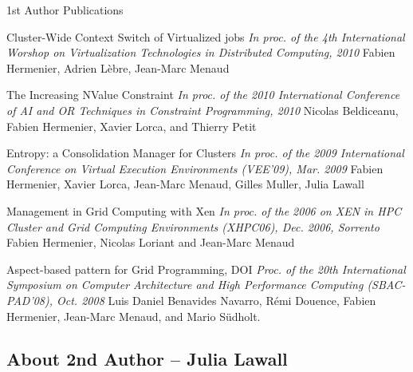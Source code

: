 \begin{frame}[shrink=10]{1st Author Publications}

\begin{thebibliography}{2}

{ 
\small 

\beamertemplatearticlebibitems {} Cluster-Wide Context 
Switch of Virtualized jobs 
\newblock\emph{ In proc. of the 4th International Worshop on Virtualization 
Technologies in Distributed Computing, 2010 }
\newblock Fabien Hermenier, Adrien Lèbre, Jean-Marc Menaud

\beamertemplatearticlebibitems {} The Increasing NValue 
Constraint
\newblock\emph{ In proc. of the 2010 International Conference of AI and OR 
Techniques in Constraint Programming, 2010 }
\newblock Nicolas Beldiceanu, Fabien Hermenier, Xavier Lorca, and Thierry Petit

\beamertemplatearticlebibitems {} Entropy: a Consolidation 
Manager for Clusters
\newblock\emph{  In proc. of the 2009 International Conference on Virtual 
Execution Environments (VEE'09), Mar. 2009 }
\newblock Fabien Hermenier, Xavier Lorca, Jean-Marc Menaud, Gilles Muller, 
Julia Lawall

\beamertemplatearticlebibitems {} Management in Grid Computing 
with Xen
\newblock\emph{In proc. of the 2006 on XEN in HPC Cluster and Grid Computing 
Environments (XHPC06), Dec. 2006, Sorrento}
\newblock Fabien Hermenier, Nicolas Loriant and Jean-Marc Menaud

\beamertemplatearticlebibitems {}Aspect-based pattern for Grid 
Programming, DOI
\newblock\emph{Proc. of the 20th International Symposium on Computer 
Architecture and High Performance Computing (SBAC-PAD'08), Oct. 2008}
\newblock Luis Daniel Benavides Navarro, Rémi Douence, Fabien Hermenier, 
Jean-Marc Menaud, and Mario Südholt.
}
\end{thebibliography}

\end{frame}



\subsection{About 2nd Author -- Julia Lawall}


